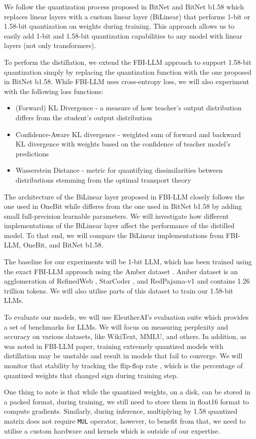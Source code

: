 \documentclass{article}
\begin{document}
 We follow the quantization process proposed in BitNet and BitNet b1.58 which replaces linear layers with a custom linear layer (BiLinear) that performs 1-bit or 1.58-bit quantization on weights during training. This approach allows us to easily add 1-bit and 1.58-bit quantization capabilities to any model with linear layers (not only transformers).

 To perform the distillation, we extend the FBI-LLM approach to support 1.58-bit quantization simply by replacing the quantization function with the one proposed in BitNet b1.58. While FBI-LLM uses cross-entropy loss, we will also experiment with the following loss functions:

\begin{itemize}
	\item (Forward) KL Divergence - a measure of how teacher's output distribution differs from the student's output distribution
	\item Confidence-Aware KL divergence - weighted sum of forward and backward KL divergence with weights based on the confidence of teacher model's predictions
	\item Wasserstein Distance - metric for quantifying dissimilarities between distributions stemming from the optimal transport theory
\end{itemize}

The architecture of the BiLinear layer proposed in FBI-LLM closely follows the one used in OneBit \cite{onebit} while differes from the one used in BitNet b1.58 by adding small full-precision learnable parameters. We will investigate how different implementations of the BiLinear layer affect the performance of the distilled model. To that end, we will compare the BiLinear implementations from FBI-LLM, OneBit, and BitNet b1.58.

The baseline for our experiments will be 1-bit LLM, which has been trained using the exact FBI-LLM approach using the Amber dataset \cite{llm360}. Amber dataset is an agglomeration of RefinedWeb \cite{refinedweb}, StarCoder \cite{starcoder}, and RedPajama-v1 \cite{redpajama} and contains 1.26 trillion tokens. We will also utilise parts of this dataset to train our 1.58-bit LLMs.

To evaluate our models, we will use EleutherAI's evaluation suite which provides a set of benchmarks for LLMs. We will focus on measuring perplexity and accuracy on various datasets, like WikiText, MMLU, and others. In addition, as was noted in FBI-LLM paper, training extremely quantized models with distillation may be unstable and result in models that fail to converge. We will monitor that stability by tracking the flip-flop rate \cite{flipflop}, which is the percentage of quantized weights that changed sign during training step.

One thing to note is that while the quantized weights, on a disk, can be stored in a packed format, during training, we still need to store them in float16 format to compute gradients. Similarly, during inference, multiplying by 1.58 quantized matrix does not require \verb|MUL| operator, however, to benefit from that, we need to utilise a custom hardware and kernels which is outside of our expertise.


\end{document}
